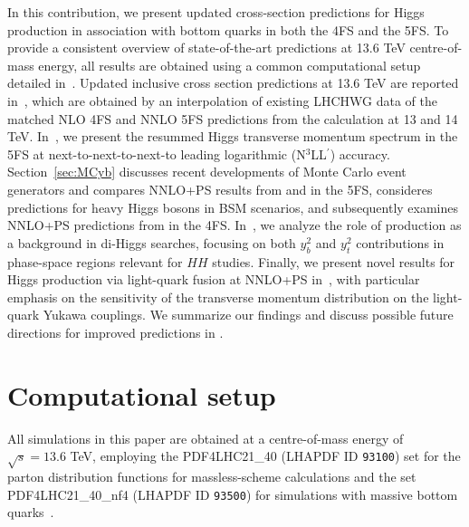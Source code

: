 \documentclass[11pt,a4paper]{article}
\begin{document}
In this contribution, we present updated cross-section predictions for Higgs production in association with bottom quarks in both the 4FS and the 5FS. 
To provide a consistent overview of state-of-the-art \bbH{} predictions at 13.6 TeV centre-of-mass energy, all results are obtained using 
a common computational setup detailed in~. Updated inclusive cross section predictions at 13.6 TeV are 
reported in~, which are obtained by an interpolation of existing LHCHWG data of the 
matched NLO 4FS and NNLO 5FS predictions from the \nlonnllpart{} calculation at 13 and 14 TeV. 
In~, we present the resummed Higgs transverse momentum spectrum in the 5FS 
at next-to-next-to-next-to leading logarithmic  (N$^3$LL$^{\prime}$) accuracy.
Section~\ref{sec:MCyb} discusses recent developments of Monte Carlo event generators and compares NNLO+PS results
from \minnlo{} and \GENEVA{} in the 5FS, consideres \minnlo{} predictions for heavy Higgs bosons in BSM scenarios, 
and subsequently examines NNLO+PS predictions from \minnlo{} in the 4FS.
In~, we analyze the role of \bbH{} production as a background in di-Higgs searches, 
focusing on both $y_b^2$ and $y_t^2$ contributions in phase-space regions relevant for $HH$ studies.
Finally, we present novel results for Higgs production via light-quark fusion at NNLO+PS in~, 
with particular emphasis on the sensitivity of the transverse momentum distribution on the  light-quark Yukawa couplings.
We summarize our findings and discuss possible future directions for improved \bbH{} predictions in .

\section{Computational setup}\label{sec:setup}
All simulations in this paper are obtained at a centre-of-mass energy of $\sqrt{s}=13.6$ TeV, employing the PDF4LHC21\_40 (LHAPDF ID \texttt{93100}) set for the parton distribution functions for massless-scheme calculations and the set PDF4LHC21\_40\_nf4 (LHAPDF ID \texttt{93500}) for simulations with massive bottom quarks~\cite{PDF4LHCWorkingGroup:2022cjn}. 
\end{document}
